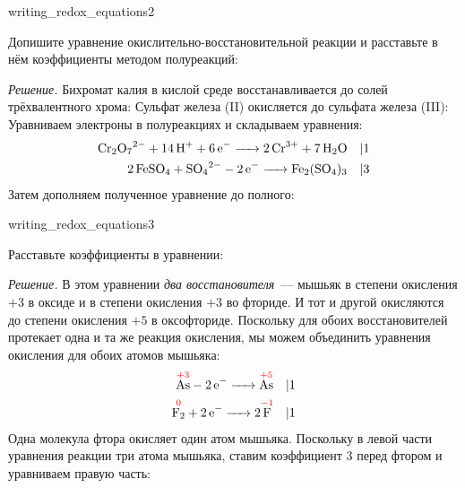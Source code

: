 \begin{example}{}{writing_redox_equations2}
    \begin{condition}
        Допишите уравнение окислительно-восстановительной реакции и расставьте в нём коэффициенты методом полуреакций:
    \end{condition}

    \medskip

    \textit{Решение.} Бихромат калия в кислой среде восстанавливается до солей трёхвалентного хрома:
    Сульфат железа (II) окисляется до сульфата железа (III):
    Уравниваем электроны в полуреакциях и складываем уравнения:
    \begin{align*}
        \ce{Cr2O7^{2-} + 14H+ + 6e- -> 2Cr^{3+} + 7H2O} \quad &| 1 \\
        \ce{2FeSO4 + SO4^{2-} - 2e- -> Fe2(SO4)3} \quad &| 3
    \end{align*}
    Затем дополняем полученное уравнение до полного:
\end{example}

\begin{example}{}{writing_redox_equations3}
    \begin{condition}
        Расставьте коэффициенты в уравнении:
    \end{condition}

    \medskip

    \textit{Решение.} В этом уравнении \emph{два восстановителя}~--- мышьяк в степени окисления $+3$ в оксиде и в степени окисления $+3$ во фториде. И тот и другой окисляются до степени окисления $+5$ в оксофториде. Поскольку для обоих восстановителей протекает одна и та же реакция окисления, мы можем объединить уравнения окисления для обоих атомов мышьяка:
    \begin{align*}
        \overset{\textcolor{red}{+3}}{\ce{As}} - \ce{2e- ->} \overset{\textcolor{red}{+5}}{\ce{As}} \quad &| 1 \\
        \overset{\textcolor{red}{0}}{\ce{F2}} + \ce{2e- ->} 2\overset{\textcolor{red}{-1}}{\ce{F}} \quad &| 1
    \end{align*}
    Одна молекула фтора окисляет один атом мышьяка. Поскольку в левой части уравнения реакции три атома мышьяка, ставим коэффициент 3 перед фтором и уравниваем правую часть:
\end{example}

